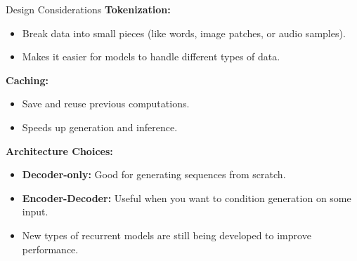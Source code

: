 \begin{frame}[allowframebreaks]{Design Considerations}
    \textbf{Tokenization:}
        \begin{itemize}
            \item Break data into small pieces (like words, image patches, or audio samples).
            \item Makes it easier for models to handle different types of data.
        \end{itemize}
    \textbf{Caching:}
        \begin{itemize}
            \item Save and reuse previous computations.
            \item Speeds up generation and inference.
        \end{itemize}
    \textbf{Architecture Choices:}
        \begin{itemize}
            \item \textbf{Decoder-only:} Good for generating sequences from scratch.
            \item \textbf{Encoder-Decoder:} Useful when you want to condition generation on some input.
            \item New types of recurrent models are still being developed to improve performance.
        \end{itemize}
\end{frame}